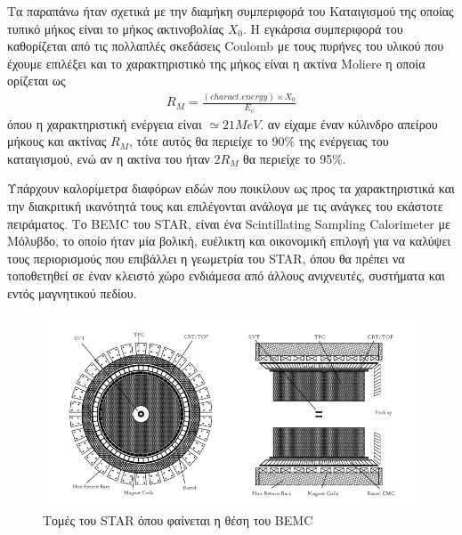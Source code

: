 	 Τα παραπάνω ήταν σχετικά με την διαμήκη συμπεριφορά του Καταιγισμού της οποίας τυπικό μήκος είναι το μήκος ακτινοβολίας $X_0$. Η εγκάρσια συμπεριφορά του καθορίζεται από τις πολλαπλές σκεδάσεις Coulomb με τους πυρήνες του υλικού που έχουμε επιλέξει και το χαρακτηριστικό της μήκος είναι η ακτίνα Moliere η οποία ορίζεται ως 
	 \begin{align}\label{eq3.5}
	 	R_M = \frac{(charact. energy)\times X_0}{E_c}
	 \end{align}
	όπου η χαρακτηριστική ενέργεια είναι $\simeq21MeV$. αν είχαμε έναν κύλινδρο απείρου μήκους και ακτίνας $R_M$, τότε αυτός θα περιείχε το 90\% της ενέργειας του καταιγισμού, ενώ αν η ακτίνα του ήταν $2R_M$ θα περιείχε το 95\%.
	
	
	Υπάρχουν καλορίμετρα διαφόρων ειδών που ποικίλουν ως προς τα χαρακτηριστικά  και την διακριτική ικανότητά τους και επιλέγονται ανάλογα με τις ανάγκες του εκάστοτε πειράματος. Το BEMC του STAR, είναι ένα Scintillating Sampling Calorimeter με Μόλυβδο, το οποίο ήταν μία βολική, ευέλικτη και οικονομική επιλογή για να καλύψει τους περιορισμούς που επιβάλλει η γεωμετρία του STAR, όπου θα πρέπει να τοποθετηθεί σε έναν κλειστό χώρο ενδιάμεσα από άλλους ανιχνευτές, συστήματα και εντός μαγνητικού πεδίου. 
	
			
			\begin{figure}[h!]
				\centering
				\includegraphics[scale=0.4]{STAR_Detectors/Detectos_Cross_Section}
				\caption{Τομές του STAR όπου φαίνεται η θέση του BEMC}
				\label{fig3.11}
			\end{figure}
	
